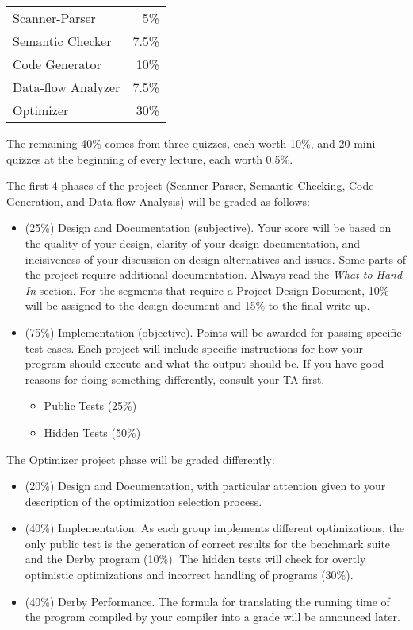 \begin{tabular}{lr}
Scanner-Parser & 5\% \\
Semantic Checker & 7.5\% \\
Code Generator & 10\% \\
Data-flow Analyzer & 7.5\% \\
Optimizer & 30\% \\
\end{tabular}

The remaining 40\% comes from three quizzes, each worth 10\%, and 20
mini-quizzes at the beginning of every lecture, each worth 0.5\%.

The first 4 phases of the project (Scanner-Parser, Semantic Checking,
Code Generation, and Data-flow Analysis) will be graded as follows:

\begin{itemize}

\item (25\%) Design and Documentation (subjective). Your score will be
based on the quality of your design, clarity of your design
documentation, and incisiveness of your discussion on design
alternatives and issues.  Some parts of the project require additional
documentation.  Always read the {\it What to Hand In} section. For the
segments that require a Project Design Document, 10\% will be assigned
to the design document and 15\% to the final write-up.


\item (75\%) Implementation (objective). Points will be awarded for
passing specific test cases.  Each project will include specific
instructions for how your program should execute and what the output
should be.  If you have good reasons for doing something differently,
consult your TA first.

\begin{itemize}
\item Public Tests (25\%)
\item Hidden Tests (50\%)
\end{itemize}

\end{itemize}

The Optimizer project phase will be graded differently:
\begin{itemize}
\item (20\%) Design and Documentation, with particular
attention given to your description of the optimization selection
process.

\item (40\%) Implementation. As each group
implements different optimizations, the only public test is the
generation of correct results for the benchmark suite and the Derby
program (10\%). The hidden tests will check for overtly optimistic
optimizations and incorrect handling of programs (30\%).

\item (40\%) Derby Performance. The formula
for translating the running time of the program compiled by your
compiler into a grade will be announced later.
\end{itemize}

